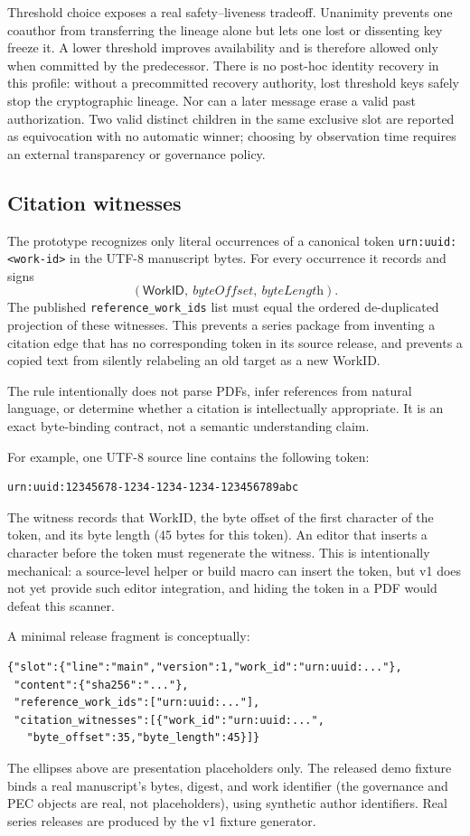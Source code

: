 \documentclass[11pt]{article}
\newcommand{\workid}{\textsf{WorkID}}
\begin{document}
Threshold choice exposes a real safety--liveness tradeoff. Unanimity prevents
one coauthor from transferring the lineage alone but lets one lost or dissenting
key freeze it. A lower threshold improves availability and is therefore allowed
only when committed by the predecessor. There is no post-hoc identity recovery
in this profile: without a precommitted recovery authority, lost threshold keys
safely stop the cryptographic lineage. Nor can a later message erase a valid
past authorization. Two valid distinct children in the same exclusive slot are
reported as equivocation with no automatic winner; choosing by observation time
requires an external transparency or governance policy.

\subsection{Citation witnesses}

The prototype recognizes only literal occurrences of a canonical token \texttt{urn:uuid:<work-id>} in the UTF-8 manuscript bytes. For every occurrence it records and signs
\[
  (\workid,\ \textit{byteOffset},\ \textit{byteLength}).
\]
The published \texttt{reference\_work\_ids} list must equal the ordered de-duplicated projection of these witnesses. This prevents a series package from inventing a citation edge that has no corresponding token in its source release, and prevents a copied text from silently relabeling an old target as a new \workid.

The rule intentionally does not parse PDFs, infer references from natural language, or determine whether a citation is intellectually appropriate. It is an exact byte-binding contract, not a semantic understanding claim.

For example, one UTF-8 source line contains the following token:
\begin{verbatim}
urn:uuid:12345678-1234-1234-1234-123456789abc
\end{verbatim}
The witness records that WorkID, the byte offset of the first character of the
token, and its byte length (45 bytes for this token). An editor that inserts a
character before the token must regenerate the witness. This is intentionally
mechanical: a source-level helper or build macro can insert the token, but v1
does not yet provide such editor integration, and hiding the token in a PDF
would defeat this scanner.

A minimal release fragment is conceptually:
\begin{verbatim}
{"slot":{"line":"main","version":1,"work_id":"urn:uuid:..."},
 "content":{"sha256":"..."},
 "reference_work_ids":["urn:uuid:..."],
 "citation_witnesses":[{"work_id":"urn:uuid:...",
   "byte_offset":35,"byte_length":45}]}
\end{verbatim}
The ellipses above are presentation placeholders only. The released demo
fixture binds a real manuscript's bytes, digest, and work identifier (the
governance and PEC objects are real, not placeholders), using synthetic author
identifiers. Real series releases are produced by the v1 fixture generator.
\end{document}
